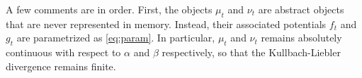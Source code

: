 A few comments are in order. First, the objects $\mu_t$ and $\nu_t$ are abstract
objects that are never represented in memory. Instead, their associated
potentials $f_t$ and $g_t$ are parametrized as \eqref{eq:param}. In particular,
$\mu_t$ and $\nu_t$ remains absolutely continuous with respect to $\alpha$ and
$\beta$ respectively, so that the Kullbach-Liebler divergence remains finite.















